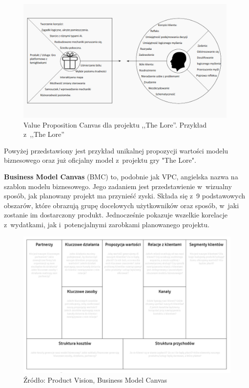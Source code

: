 \documentclass[oneside,polski,logo]{amuthesis}
\begin{document}
\begin{figure}[hb!]
	\centering
	\includegraphics[width=11cm]{images/hyps/VPC-The Lore.png}
	\caption{Value Proposition Canvas dla projektu ,,The Lore''. Przykład z~,,The Lore''}
\end{figure}
Powyżej przedstawiony jest przykład unikalnej propozycji wartości modelu biznesowego oraz już oficjalny model z~projektu gry "The Lore".

\textbf{Business Model Canvas} (BMC) to, podobnie jak VPC, angielska nazwa na szablon modelu biznesowego. Jego zadaniem jest przedstawienie w~wizualny sposób, jak planowany projekt ma przynieść zyski. Składa się z~9 podstawowych obszarów, które obrazują grupę docelowych użytkowników oraz sposób, w~jaki zostanie im dostarczony produkt. Jednocześnie pokazuje wszelkie korelacje z~wydatkami, jak i~potencjalnymi zarobkami planowanego projektu. \cite{BMC}

\begin{figure}[h]
	\centering
	\includegraphics[width=13cm]{images/hyps/BMC.png}
	\caption{Źródło: Product Vision, Business Model Canvas}
\end{figure}
\end{document}
